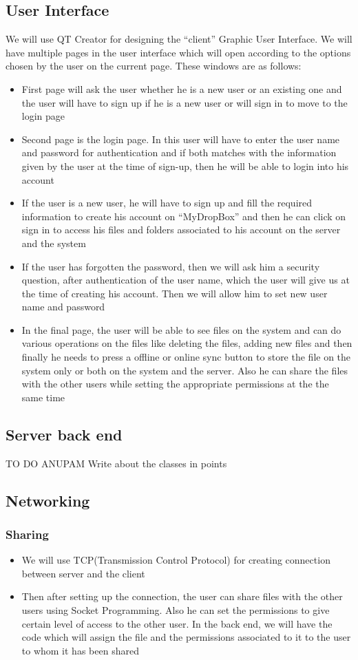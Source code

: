 \documentclass{article}
\begin{document}
		\subsection{User Interface}
		We will use QT Creator for designing the ``client'' Graphic User Interface. We will have multiple pages in the user interface which will open according to the options chosen by the user on the current page. These windows are as follows:
			\begin{itemize}
				\item First page will ask the user whether he is a new user or an existing one and the user will have to sign up if he is a new user or  will sign in to move to the login page
				\item Second page is the login page. In this user will have to enter the user name and password for authentication and if both matches with the information given by the user at the time of sign-up, then he will be able to login into his account
				\item If the user is a new user, he will have to sign up and fill the required information to create his account on ``MyDropBox'' and then he can click on sign in to access his files and folders associated to his account on the server and the system
				\item If the user has forgotten the password, then we will ask him a security question, after authentication of the user name, which the user will give us at the time of creating his account. Then we will allow him to set new user name and password
				\item In the final page, the user will be able to see files on the system and can do various operations on the files like deleting the files, adding new files and then finally he needs to press a offline or online sync button to store the file on the system only or both on the system and the server. Also he can share the files with the other users while setting the appropriate permissions at the the same time
			\end{itemize}
		\subsection{Server back end}
			TO DO ANUPAM
			Write about the classes in points
		\subsection{Networking}
			\subsubsection{Sharing}
				\begin{itemize}
					\item We will use TCP(Transmission Control Protocol) for creating connection between server and the client
					\item Then after setting up the connection, the user can share files with the other users using Socket Programming. Also he can set the permissions to give certain level of access to the other user. In the back end, we will have the code which will assign the file and the permissions associated to it to the user to whom it has been shared
				\end{itemize}
\end{document}
